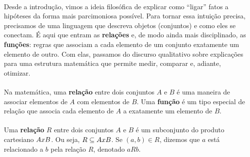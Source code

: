 \documentclass[12pt,a4paper]{article}
\def\times{\string x}%
\begin{document}
\paragraph{}
Desde a introdução, vimos a ideia filosófica de explicar como “ligar” fatos a hipóteses da forma mais parcimoniosa possível. Para tornar essa intuição precisa, precisamos de uma linguagem que descreva objetos (conjuntos) e como eles se conectam. É aqui que entram as \textbf{relações} e, de modo ainda mais disciplinado, as \textbf{funções}: regras que associam a cada elemento de um conjunto exatamente um elemento de outro. Com elas, passamos do discurso qualitativo sobre explicações para uma estrutura matemática que permite medir, comparar e, adiante, otimizar.


\paragraph{}
Na matemática, uma \textbf{relação} entre dois conjuntos \(A\) e \(B\) é uma maneira de associar elementos de \(A\) com elementos de \(B\). Uma \textbf{função} é um tipo especial de relação que associa cada elemento de \(A\) a exatamente um elemento de \(B\).

\paragraph{}
Uma \textbf{relação} \(R\) entre dois conjuntos \(A\) e \(B\) é um subconjunto do produto cartesiano \(A \times B\). Ou seja, \(R \subseteq A \times B\). Se \((a,b) \in R\), dizemos que \(a\) está relacionado a \(b\) pela relação \(R\), denotado \(aRb\).
\end{document}
